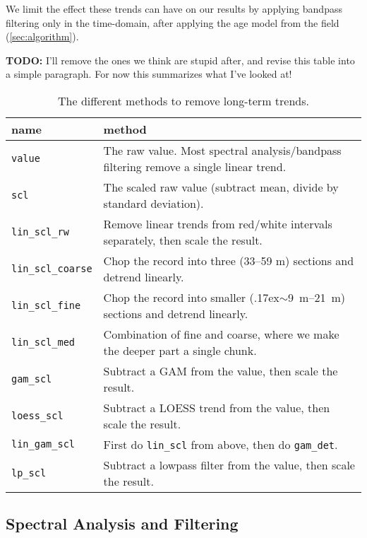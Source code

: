 \documentclass[draft]{agujournal2019}
\newcommand{\appr}{\raise.17ex\hbox{$\scriptstyle\sim$}} %
\begin{document}
We limit the effect these trends can have on our results by applying bandpass filtering only in the time-domain, after applying the age model from the field (\cref{sec:algorithm}).

\textbf{TODO:} I'll remove the ones we think are stupid after, and revise this table into a simple paragraph. For now this summarizes what I've looked at!

\begin{table}[htbp]
  \caption{\label{tab:detrend_types}
    The different methods to remove long-term trends.}
\centering
\begin{tabular}{ll}
  name & method\\
  \hline
  \texttt{value} & The raw value. Most spectral analysis/bandpass filtering remove a single linear trend.\\
  \texttt{scl} & The scaled raw value (subtract mean, divide by standard deviation). \\
  \texttt{lin\_scl\_rw} & Remove linear trends from red/white intervals separately, then scale the result.\\ %
  \texttt{lin\_scl\_coarse} & Chop the record into three (33--59 m) sections and detrend linearly.\\
  \texttt{lin\_scl\_fine} & Chop the record into smaller (\appr\qtyrange{9}{21}{\metre}) sections and detrend linearly.\\
  \texttt{lin\_scl\_med} & Combination of fine and coarse, where we make the deeper part a single chunk.\\
  \texttt{gam\_scl} & Subtract a \gls{GAM} from the value, then scale the result.\\
  \texttt{loess\_scl} & Subtract a LOESS trend from the value, then scale the result.\\
  \texttt{lin\_gam\_scl} & First do \texttt{lin\_scl} from above, then do \texttt{gam\_det}.\\ %
  \texttt{lp\_scl} & Subtract a lowpass filter from the value, then scale the result.\\
\end{tabular}
\end{table}

\subsection{Spectral Analysis and Filtering}\label{sec:spectral}
\end{document}
